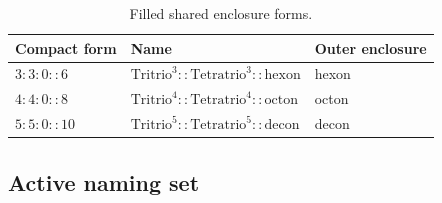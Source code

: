 \begin{table}[H]
\centering
\caption{Filled shared enclosure forms.}
\label{tab:cc-filled-shared-enclosures}
\renewcommand{\arraystretch}{1.15}
\begin{tabular}{@{}lll@{}}
\toprule
Compact form & Name & Outer enclosure \\
\midrule
\(3:3:0::6\) & \(\mathrm{Tritrio}^{3}::\mathrm{Tetratrio}^{3}::\mathrm{hexon}\) & hexon \\
\(4:4:0::8\) & \(\mathrm{Tritrio}^{4}::\mathrm{Tetratrio}^{4}::\mathrm{octon}\) & octon \\
\(5:5:0::10\) & \(\mathrm{Tritrio}^{5}::\mathrm{Tetratrio}^{5}::\mathrm{decon}\) & decon \\
\bottomrule
\end{tabular}
\end{table}


\subsection{Active naming set}
\label{app:cc-active-naming-set}
\label{app:cc-standalone-enclosed-names}

